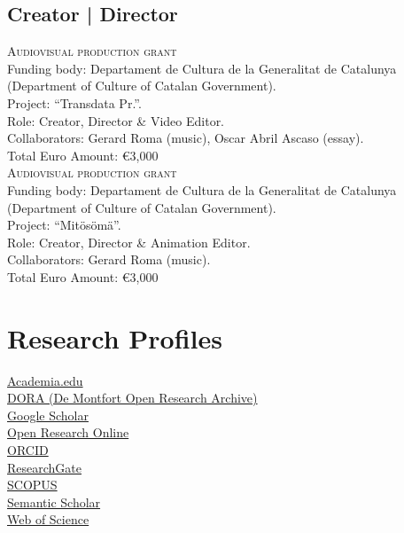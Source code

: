 \documentclass[10pt, a4paper]{article}
\newcommand{\years}[1]{\marginnote{\scriptsize #1}}
\begin{document}
\subsection*{Creator | Director}

\years{09/2001--08/2002}\textsc{Audiovisual production grant} \\
Funding body: Departament de Cultura de la Generalitat de Catalunya (Department of Culture of Catalan Government).\\
Project: ``Transdata Pr.''.  \\
Role: Creator, Director \& Video Editor.\\
Collaborators: Gerard Roma (music), Oscar Abril Ascaso (essay). \\
Total Euro Amount: \euro3,000\\ 

\years{09/1998--08/1999}\textsc{Audiovisual production grant} \\
Funding body: Departament de Cultura de la Generalitat de Catalunya (Department of Culture of Catalan Government).\\
Project: ``Mitösömä''.  \\
Role: Creator, Director \& Animation Editor.\\
Collaborators: Gerard Roma (music). \\
Total Euro Amount: \euro3,000 



\section*{Research Profiles}
\noindent

\textbullet \- \href{http://open.academia.edu/AnnaXambo}{Academia.edu}\\
\textbullet \- \href{https://dora.dmu.ac.uk/browse?type=author&value=Xambo,\%20Anna}{DORA (De Montfort Open Research Archive)}\\
\textbullet \- \href{https://scholar.google.com/citations?user=yi3WXM8AAAAJ}{Google Scholar}\\
\textbullet \- \href{http://oro.open.ac.uk/view/person/ax22.html}{Open Research Online}\\
\textbullet \- \href{https://orcid.org/0000-0003-2333-6941}{ORCID}\\
\textbullet \- \href{http://www.researchgate.net/profile/Anna_Xambo}{ResearchGate}\\
\textbullet \- \href{https://www.scopus.com/authid/detail.uri?authorId=36642886000}{SCOPUS}\\
\textbullet \- \href{https://www.semanticscholar.org/author/Anna-Xamb\%C3\%B3/1915531}{Semantic Scholar}\\
\textbullet \- \href{https://publons.com/researcher/3980818/anna-xambo}{Web of Science}
\end{document}
